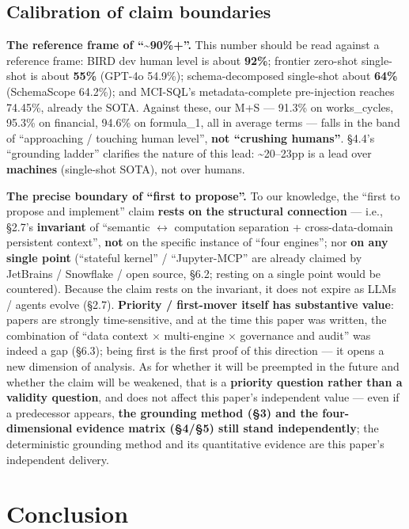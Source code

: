 \documentclass[11pt]{article}
\begin{document}
\subsection{Calibration of claim boundaries}

\textbf{ The reference frame of ``\textasciitilde90\%+''.} This number should be read against a reference frame: BIRD dev human level is about \textbf{92\%}; frontier zero-shot single-shot is about \textbf{55\%} (GPT-4o 54.9\%); schema-decomposed single-shot about \textbf{64\%} (SchemaScope \cite{schemascope} 64.2\%); and MCI-SQL's metadata-complete pre-injection reaches 74.45\%, already the SOTA. Against these, our M+S --- 91.3\% on works\_cycles, 95.3\% on financial, 94.6\% on formula\_1, all in average terms --- falls in the band of ``approaching / touching human level'', \textbf{not ``crushing humans''}. \S{}4.4's ``grounding ladder'' clarifies the nature of this lead: \textasciitilde20--23pp is a lead over \textbf{machines} (single-shot SOTA), not over humans.

\textbf{ The precise boundary of ``first to propose''.} To our knowledge, the ``first to propose and implement'' claim \textbf{rests on the structural connection} --- i.e., \S{}2.7's \textbf{invariant} of ``semantic $\leftrightarrow$ computation separation + cross-data-domain persistent context'', \textbf{not} on the specific instance of ``four engines''; nor \textbf{on any single point} (``stateful kernel'' / ``Jupyter-MCP'' are already claimed by JetBrains / Snowflake / open source, \S{}6.2; resting on a single point would be countered). Because the claim rests on the invariant, it does not expire as LLMs / agents evolve (\S{}2.7). \textbf{Priority / first-mover itself has substantive value}: papers are strongly time-sensitive, and at the time this paper was written, the combination of ``data context $\times$ multi-engine $\times$ governance and audit'' was indeed a gap (\S{}6.3); being first is the first proof of this direction --- it opens a new dimension of analysis. As for whether it will be preempted in the future and whether the claim will be weakened, that is a \textbf{priority question rather than a validity question}, and does not affect this paper's independent value --- even if a predecessor appears, \textbf{the grounding method (\S{}3) and the four-dimensional evidence matrix (\S{}4/\S{}5) still stand independently}; the deterministic grounding method and its quantitative evidence are this paper's independent delivery.

\section{Conclusion}
\end{document}
